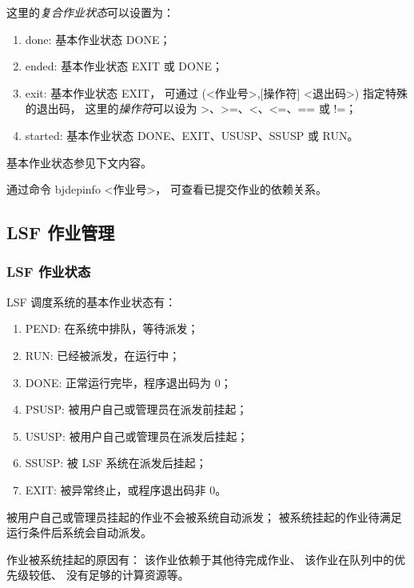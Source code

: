 \documentclass[UTF8]{ctexart}
\newcommand{\mynnote}[1]{\colorbox{gray!15}{\color{blue!65}#1}}
\begin{document}
这里的{\em 复合作业状态}可以设置为：
\begin{enumerate}[\hspace{15mm}（1）]
  \item done: 基本作业状态 DONE；
  \item ended: 基本作业状态 EXIT 或 DONE；
  \item exit: 基本作业状态 EXIT，
    可通过 \mynnote{(<作业号>,[操作符] <退出码>)} 指定特殊的退出码，
    这里的{\em 操作符}可以设为 >、>=、<、<=、== 或 !=；
  \item started: 基本作业状态 DONE、EXIT、USUSP、SSUSP 或 RUN。
\end{enumerate}
基本作业状态参见下文内容。

通过命令 \mynnote{bjdepinfo <作业号>}，
可查看已提交作业的依赖关系。

\subsection{LSF 作业管理}
\subsubsection{LSF 作业状态}
LSF 调度系统的基本作业状态有：
\begin{enumerate}[\hspace{15mm}（1）]
  \item PEND: 在系统中排队，等待派发；
  \item RUN: 已经被派发，在运行中；
  \item DONE: 正常运行完毕，程序退出码为 0；
  \item PSUSP: 被用户自己或管理员在派发前挂起；
  \item USUSP: 被用户自己或管理员在派发后挂起；
  \item SSUSP: 被 LSF 系统在派发后挂起；
  \item EXIT: 被异常终止，或程序退出码非 0。
\end{enumerate}

被用户自己或管理员挂起的作业不会被系统自动派发；
被系统挂起的作业待满足运行条件后系统会自动派发。

作业被系统挂起的原因有：
该作业依赖于其他待完成作业、
该作业在队列中的优先级较低、
没有足够的计算资源等。
\end{document}

